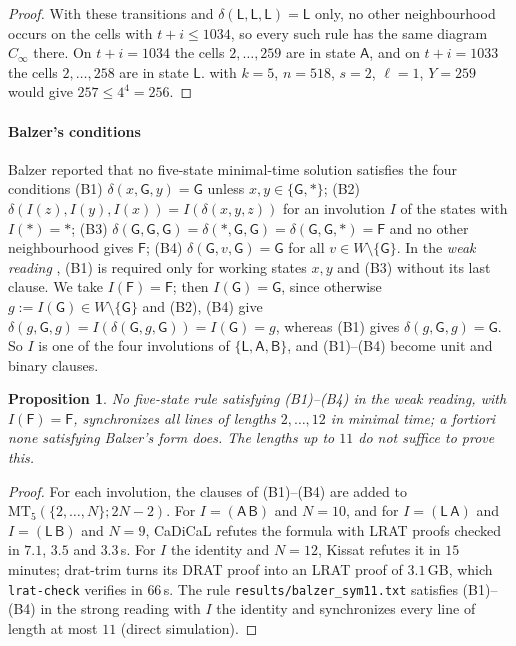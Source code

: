 \documentclass[3p]{elsarticle}
\newtheorem{proposition}[theorem]{Proposition}
\theoremstyle{definition}
\newcommand{\Lq}{\mathsf L}
\newcommand{\Gq}{\mathsf G}
\newcommand{\Aq}{\mathsf A}
\newcommand{\Bq}{\mathsf B}
\newcommand{\Fq}{\mathsf F}
\begin{document}
\begin{proof}
With these transitions and $\delta(\Lq,\Lq,\Lq)=\Lq$ only, no other
neighbourhood occurs on the cells with $t+i\le1034$, so every such rule has the
same diagram $C_\infty$ there. On $t+i=1034$ the cells $2,\dots,259$ are in
state $\Aq$, and on $t+i=1033$ the cells $2,\dots,258$ are in state $\Lq$.
 with $k=5$, $n=518$, $s=2$, $\ell=1$, $Y=259$ would give
$257\le4^4=256$.
\end{proof}

\paragraph{Balzer's conditions} Balzer \cite[p.~37]{Balzer67} reported that no
five-state minimal-time solution satisfies the four conditions
(B1) $\delta(x,\Gq,y)=\Gq$ unless $x,y\in\{\Gq,\ast\}$;
(B2) $\delta(I(z),I(y),I(x))=I(\delta(x,y,z))$ for an involution $I$ of the
states with $I(\ast)=\ast$;
(B3) $\delta(\Gq,\Gq,\Gq)=\delta(\ast,\Gq,\Gq)=\delta(\Gq,\Gq,\ast)=\Fq$ and no
other neighbourhood gives $\Fq$;
(B4) $\delta(\Gq,v,\Gq)=\Gq$ for all $v\in W\setminus\{\Gq\}$.
In the \emph{weak reading} \cite{Yunes93}, (B1) is required only for working
states $x,y$ and (B3) without its last clause. We take $I(\Fq)=\Fq$; then
$I(\Gq)=\Gq$, since otherwise $g:=I(\Gq)\in W\setminus\{\Gq\}$ and (B2), (B4)
give $\delta(g,\Gq,g)=I(\delta(\Gq,g,\Gq))=I(\Gq)=g$, whereas (B1) gives
$\delta(g,\Gq,g)=\Gq$. So $I$ is one of the four involutions of
$\{\Lq,\Aq,\Bq\}$, and (B1)--(B4) become unit and binary clauses.

\begin{proposition}\label{prop:balzer}
No five-state rule satisfying (B1)--(B4) in the weak reading, with
$I(\Fq)=\Fq$, synchronizes all lines of lengths $2,\dots,12$ in minimal time;
a fortiori none satisfying Balzer's form does. The lengths up to $11$ do not
suffice to prove this.
\end{proposition}

\begin{proof}
For each involution, the clauses of (B1)--(B4) are added to
$\mathrm{MT}_5(\{2,\dots,N\};2N-2)$. For $I=(\Aq\,\Bq)$ and $N=10$, and for
$I=(\Lq\,\Aq)$ and $I=(\Lq\,\Bq)$ and $N=9$, CaDiCaL refutes the formula with
LRAT proofs checked in $7.1$, $3.5$ and $3.3$\,s. For $I$ the identity and
$N=12$, Kissat refutes it in $15$ minutes; \textsf{drat-trim} turns its DRAT
proof into an LRAT proof of $3.1$\,GB, which \texttt{lrat-check} verifies in
$66$\,s. The rule \texttt{results/balzer\_sym11.txt} satisfies (B1)--(B4) in
the strong reading with $I$ the identity and synchronizes every line of length
at most $11$ (direct simulation).
\end{proof}
\end{document}
